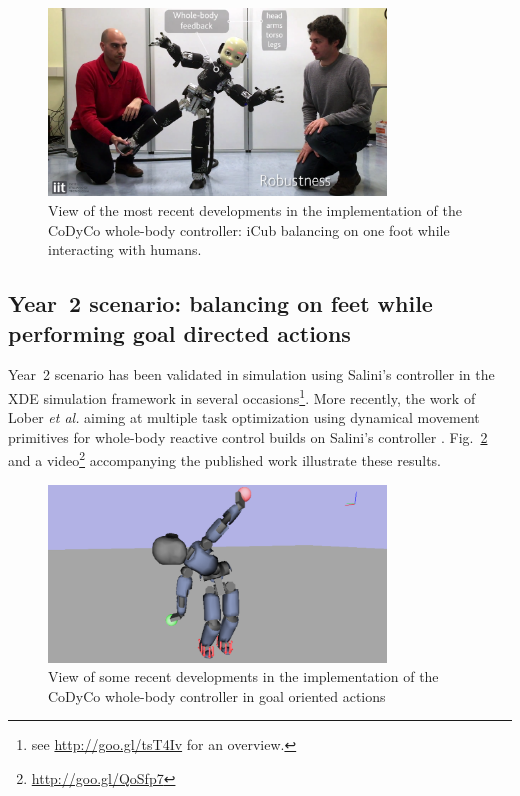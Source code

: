 \documentclass[12pt,a4paper,twoside]{article}
\begin{document}
    \begin{figure}[h!]
      \centering
      \includegraphics[width=0.8\textwidth]{figure/cool_balancing_demo}
      \caption{View of the most recent developments in the implementation of the CoDyCo whole-body controller: iCub balancing on one foot while interacting with humans.}
      \label{fig:cool_balancing}
   \end{figure}

\subsection{Year~2 scenario: balancing on feet while performing goal directed actions}

Year~2 scenario has been validated in simulation using Salini's controller in the XDE simulation framework in several occasions\footnote{see \url{http://goo.gl/tsT4Iv} for an overview.}. More recently, the work of Lober \textit{et al.} aiming at multiple task optimization using dynamical movement primitives for whole-body reactive control builds on Salini's controller \cite{lober-HUMANOIDS2014}. Fig.~\ref{fig:lober-hum14} and a video\footnote{\url{http://goo.gl/QoSfp7}} accompanying the published work illustrate these results.\\

    \begin{figure}[h!]
      \centering
      \includegraphics[width=0.8\textwidth]{figure/lober_hum14}
      \caption{View of some recent developments in the implementation of the CoDyCo whole-body controller in goal oriented actions}
      \label{fig:lober-hum14}
   \end{figure}
\end{document}
